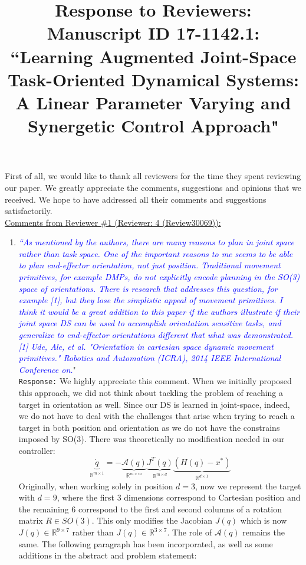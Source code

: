 \documentclass{article}
\title{Response to Reviewers: Manuscript ID 17-1142.1: ``Learning Augmented Joint-Space Task-Oriented Dynamical Systems: A Linear Parameter Varying and Synergetic Control Approach"}
\begin{document}
\maketitle
\small
First of all, we would like to thank all reviewers for the time they spent reviewing our paper. We greatly appreciate the comments, suggestions and opinions that we received. We hope to have addressed all their comments and suggestions satisfactorily.\\

\noindent \underline{Comments from Reviewer \#1 (Reviewer: 4 (Review30069)):}
\begin{enumerate}
\item \textcolor{blue}{\textit{``As mentioned by the authors, there are many reasons to plan in joint space rather than task space. One of the important reasons to me seems to be able to plan end-effector orientation, not just position. Traditional movement primitives, for example DMPs, do not explicitly encode planning in the SO(3) space of orientations. There is research that addresses this question, for example [1], but they lose the simplistic appeal of movement primitives. I think it would be a great addition to this paper if the authors illustrate if their joint space DS can be used to accomplish orientation sensitive tasks, and generalize to end-effector orientations different that what was demonstrated.[1] Ude, Ale, et al. "Orientation in cartesian space dynamic movement primitives." Robotics and Automation (ICRA), 2014 IEEE International Conference on.}}"\\
\texttt{Response:}  We highly appreciate this comment. When we initially proposed this approach, we did not think about tackling the problem of reaching a target in orientation as well. Since our DS is learned in joint-space, indeed, we do not have to deal with the challenges that arise when trying to reach a target in both position and orientation as we do not have the constrains imposed by SO(3). There was theoretically no modification needed in our controller:
\begin{equation}
\underbrace{\dot{q}}_{\mathbb{R}^{m\times 1}} = -\underbrace{\mathcal{A}(q)}_{\mathbb{R}^{m\times m}}\underbrace{J^{T}(q)}_{\mathbb{R}^{m\times d}}\underbrace{(H(q)-x^*)}_{\mathbb{R}^{d\times 1}}
\label{eq:jtds}
\end{equation}
Originally, when working solely in position $d=3$, now we represent the target with $d=9$, where the first 3 dimensions correspond to Cartesian position and the remaining 6 correspond to the first and second columns of a rotation matrix $R \in SO(3)$. This only modifies the Jacobian $J(q)$ which is now $J(q)\in \mathbb{R}^{9 \times 7}$ rather than $J(q)\in \mathbb{R}^{3 \times 7}$. The role of $\mathcal{A}(q)$ remains  the same. The following paragraph has been incorporated, as well as some additions in the abstract and problem statement:

\end{enumerate}
\end{document}
